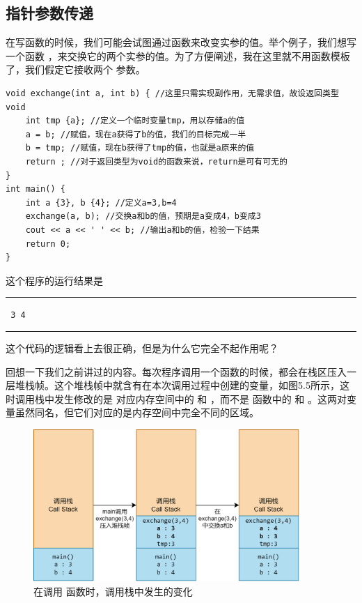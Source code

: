 \subsection*{指针参数传递}
在写函数的时候，我们可能会试图通过函数来改变实参的值。举个例子，我们想写一个函数 \lstinline@exchange@，来交换它的两个实参的值。为了方便阐述，我在这里就不用函数模板了，我们假定它接收两个 \lstinline@int@ 参数。
\begin{lstlisting}
void exchange(int a, int b) { //这里只需实现副作用，无需求值，故设返回类型void
    int tmp {a}; //定义一个临时变量tmp，用以存储a的值
    a = b; //赋值，现在a获得了b的值，我们的目标完成一半
    b = tmp; //赋值，现在b获得了tmp的值，也就是a原来的值
    return ; //对于返回类型为void的函数来说，return是可有可无的
}
int main() {
    int a {3}, b {4}; //定义a=3,b=4
    exchange(a, b); //交换a和b的值，预期是a变成4，b变成3
    cout << a << ' ' << b; //输出a和b的值，检验一下结果
    return 0;
}
\end{lstlisting}
这个程序的运行结果是\\\noindent\rule{\linewidth}{0.2pt}\texttt{
3 4
}\\\noindent\rule{\linewidth}{0.2pt}
这个代码的逻辑看上去很正确，但是为什么它完全不起作用呢？\par
回想一下我们之前讲过的内容。每次程序调用一个函数的时候，都会在栈区压入一层堆栈帧。这个堆栈帧中就含有在本次调用过程中创建的变量，如图5.5所示，这时调用栈中发生修改的是 \lstinline@exchange@ 对应内存空间中的 \lstinline@a@ 和 \lstinline@b@，而不是 \lstinline@main@ 函数中的 \lstinline@a@ 和 \lstinline@b@。这两对变量虽然同名，但它们对应的是内存空间中完全不同的区域。\par
\begin{figure}[htbp]
    \centering
    \includegraphics[width=0.9\textwidth]{../images/generalized_parts/05_parameter_pass_by_value_300.png}
    \caption{在调用 \lstinline@exchange@ 函数时，调用栈中发生的变化}
\end{figure}
